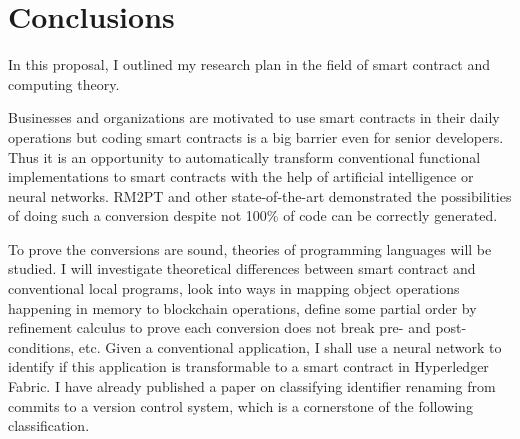 \chapter{Conclusions}

In this proposal, I outlined my research plan in the field of smart contract and computing theory.

Businesses and organizations are motivated to use smart contracts in their daily operations
but coding smart contracts is a big barrier even for senior developers.
Thus it is an opportunity to automatically transform conventional functional implementations to smart contracts with the help of artificial intelligence or neural networks.
RM2PT and other state-of-the-art demonstrated the possibilities of doing such a conversion despite not 100\% of code can be correctly generated.


To prove the conversions are sound, theories of programming languages will be studied. I will investigate theoretical differences between smart contract and conventional local programs,
look into ways in mapping object operations happening in memory to blockchain operations, define some partial order by refinement calculus to prove each conversion does not break pre- and post-conditions, etc.
Given a conventional application, I shall use a neural network to identify if this application is transformable to a smart contract in Hyperledger Fabric.
I have already published a paper on classifying identifier renaming from commits to a version control system, which is a cornerstone of the following classification.








